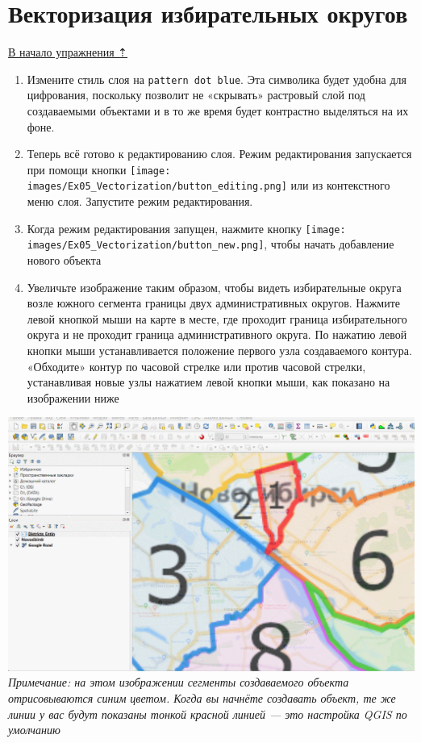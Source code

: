 \documentclass[
  12pt,
]{book}
\begin{document}
\hypertarget{digitizing-drawing}{%
\section{Векторизация избирательных округов}\label{digitizing-drawing}}

\protect\hyperlink{digitizingf-districts}{В начало упражнения ⇡}

\begin{enumerate}
\def\labelenumi{\arabic{enumi}.}
\item
  Измените стиль слоя на \texttt{pattern\ dot\ blue}. Эта символика будет удобна для цифрования, поскольку позволит не «скрывать» растровый слой под создаваемыми объектами и в то же время будет контрастно выделяться на их фоне.
\item
  Теперь всё готово к редактированию слоя. Режим редактирования запускается при помощи кнопки \texttt{[image: images/Ex05\_Vectorization/button\_editing.png]} или из контекстного меню слоя. Запустите режим редактирования.
\item
  Когда режим редактирования запущен, нажмите кнопку \texttt{[image: images/Ex05\_Vectorization/button\_new.png]}, чтобы начать добавление нового объекта
\item
  Увеличьте изображение таким образом, чтобы видеть избирательные округа возле южного сегмента границы двух административных округов. Нажмите левой кнопкой мыши на карте в месте, где проходит граница избирательного округа и не проходит граница административного округа. По нажатию левой кнопки мыши устанавливается положение первого узла создаваемого контура. «Обходите» контур по часовой стрелке или против часовой стрелки, устанавливая новые узлы нажатием левой кнопки мыши, как показано на изображении ниже
\end{enumerate}

\includegraphics{images/Ex05_Vectorization/new_object.gif}
\emph{Примечание: на этом изображении сегменты создаваемого объекта отрисовываются синим цветом. Когда вы начнёте создавать объект, те же линии у вас будут показаны тонкой красной линией --- это настройка QGIS по умолчанию}
\end{document}
